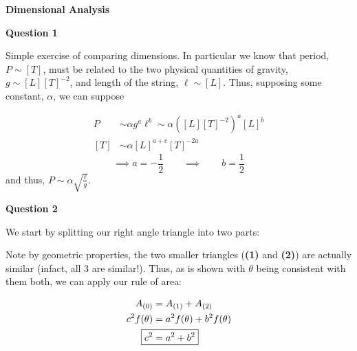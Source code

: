 \documentclass[10pt]{article}
\begin{document}
\textbf{\Large Dimensional Analysis}

\textbf{Question 1}

Simple exercise of comparing dimensions. In particular we know that period, $P \sim [T]$, must be related to the two physical quantities of gravity, $g \sim [L][T]^{-2}$, and length of the string, $\ell \sim [L]$. Thus, supposing some constant, $\alpha$, we can suppose

\begin{align*}
  P & \sim \alpha g^{a}\ell^{b} \sim \alpha\left([L][T]^{-2}\right)^{a}[L]^{b} \\
  [T] & \sim \alpha [L]^{a + c}[T]^{-2a} 
\end{align*}
\[
\implies a = -\frac{1}{2} \hspace{2em} \implies \hspace{2em} b = \frac{1}{2}
\]
and thus, $P \sim \alpha\sqrt{\frac{\ell}{g}}$.

\textbf{Question 2}

We start by splitting our right angle triangle into two parts:

\begin{center}
\end{center}

Note by geometric properties, the two smaller triangles (\textbf{(1)} and \textbf{(2)}) are actually similar (infact, all 3 are similar!). Thus, as is shown with $\theta$ being consistent with them both, we can apply our rule of area:

\[
\begin{aligned}
  A_{(0)} & = A_{(1)} + A_{(2)} \\
  c^{2}f(\theta) & = a^{2}f(\theta) + b^{2}f(\theta) \\
  \Aboxed{c^{2} & = a^{2} + b^{2}}
\end{aligned}
\]
\end{document}
